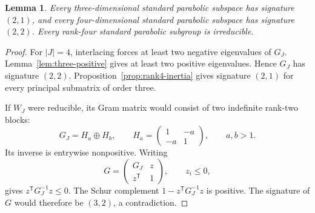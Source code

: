 \documentclass[11pt,reqno]{amsart}
\theoremstyle{plain}
\newtheorem{lemma}[theorem]{Lemma}
\theoremstyle{definition}
\theoremstyle{remark}
\numberwithin{equation}{section}
\begin{document}
\begin{lemma}\label{lem:23-principal}
Every three-dimensional standard parabolic subspace has signature $(2,1)$, and every four-dimensional standard parabolic subspace has signature $(2,2)$. Every rank-four standard parabolic subgroup is irreducible.
\end{lemma}
\begin{proof}
For $|J|=4$, interlacing forces at least two negative eigenvalues of $G_J$. Lemma~\ref{lem:three-positive} gives at least two positive eigenvalues. Hence $G_J$ has signature $(2,2)$. Proposition~\ref{prop:rank4-inertia} gives signature $(2,1)$ for every principal submatrix of order three.

If $W_J$ were reducible, its Gram matrix would consist of two indefinite rank-two blocks:
\[
G_J=H_a\oplus H_b,\qquad H_a=\begin{pmatrix}1&-a\\-a&1\end{pmatrix},\qquad a,b>1.
\]
Its inverse is entrywise nonpositive. Writing
\[
G=\begin{pmatrix}G_J&z\\z^{\mathsf T}&1\end{pmatrix},\qquad z_i\leq0,
\]
gives $z^{\mathsf T}G_J^{-1}z\leq0$. The Schur complement $1-z^{\mathsf T}G_J^{-1}z$ is positive. The signature of $G$ would therefore be $(3,2)$, a contradiction.
\end{proof}
\end{document}
